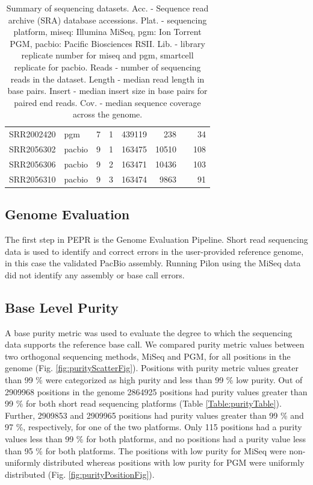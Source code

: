 \documentclass[smallextended]{svjour3}\usepackage[]{graphicx}\usepackage[]{color}
\begin{document}
\begin{table}[ht]
\begin{tabular}{llrrrrrr}
  SRR2002420 & pgm & 7 & 1 & 439119 & 238 &  & 34 \\ 
  SRR2056302 & pacbio & 9 & 1 & 163475 & 10510 &  & 108 \\ 
  SRR2056306 & pacbio & 9 & 2 & 163471 & 10436 &  & 103 \\ 
  SRR2056310 & pacbio & 9 & 3 & 163474 & 9863 &  & 91 \\ 
   \hline
\end{tabular}
\caption{Summary of sequencing datasets.  Acc. - Sequence read archive (SRA) database accessions. Plat. - sequencing platform, miseq: Illumina MiSeq, pgm: Ion Torrent PGM, pacbio: Pacific Biosciences RSII. Lib. - library replicate number for miseq and pgm, smartcell replicate for pacbio. Reads - number of sequencing reads in the dataset. Length - median read length in base pairs.  Insert - median insert size in base pairs for paired end reads.  Cov. - median sequence coverage across the genome.} 
\label{Table:seqTable}
\end{table}


\subsection{Genome Evaluation}
The first step in PEPR is the Genome Evaluation Pipeline.  Short read sequencing data is used to identify and correct errors in the user-provided reference genome, in this case the validated PacBio assembly. Running Pilon using the MiSeq data did not identify any assembly or base call errors. 

\subsection{Base Level Purity}



A base purity metric was used to evaluate the degree to which the sequencing data supports the reference base call.  We compared purity metric values between two orthogonal sequencing methods, MiSeq and PGM, for all positions in the genome (Fig. \ref{fig:purityScatterFig}). Positions with purity metric values greater than 99 \% were categorized as high purity and less than 99 \% low purity. Out of 2909968 positions in the genome 2864925 positions had purity values greater than 99 \% for both short read sequencing platforms (Table \ref{Table:purityTable}).  Further, 2909853 and 2909965 positions had purity values greater than 99 \% and 97 \%, respectively, for one of the two platforms.  Only 115 positions had a purity values less than 99 \% for both platforms, and no positions had a purity value less than 95 \% for both platforms. The positions with low purity for MiSeq were non-uniformly distributed whereas positions with low purity for PGM were uniformly distributed (Fig. \ref{fig:purityPositionFig}).  
\end{document}

